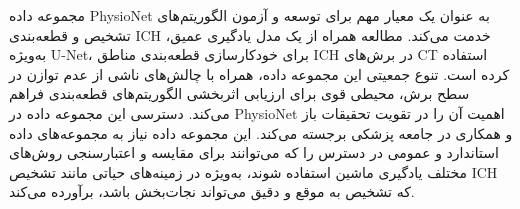 مجموعه داده PhysioNet به عنوان یک معیار مهم برای توسعه و آزمون الگوریتم‌های تشخیص و قطعه‌بندی ICH خدمت می‌کند. مطالعه همراه از یک مدل یادگیری عمیق، به‌ویژه U-Net، برای خودکارسازی قطعه‌بندی مناطق ICH در برش‌های CT استفاده کرده است. تنوع جمعیتی این مجموعه داده، همراه با چالش‌های ناشی از عدم توازن در سطح برش، محیطی قوی برای ارزیابی اثربخشی الگوریتم‌های قطعه‌بندی فراهم می‌کند.
دسترسی این مجموعه داده در PhysioNet اهمیت آن را در تقویت تحقیقات باز و همکاری در جامعه پزشکی برجسته می‌کند. این مجموعه داده نیاز به مجموعه‌های داده استاندارد و عمومی در دسترس را که می‌توانند برای مقایسه و اعتبارسنجی روش‌های مختلف یادگیری ماشین استفاده شوند، به‌ویژه در زمینه‌های حیاتی مانند تشخیص ICH که تشخیص به موقع و دقیق می‌تواند نجات‌بخش باشد، برآورده می‌کند.
